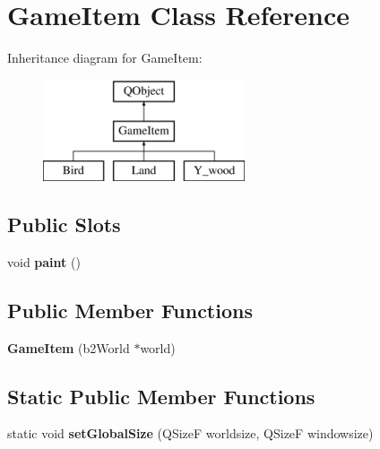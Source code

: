 \hypertarget{classGameItem}{\section{Game\-Item Class Reference}
\label{classGameItem}
}
Inheritance diagram for Game\-Item\-:\begin{figure}[H]
\begin{center}
\leavevmode
\includegraphics[height=3.000000cm]{classGameItem}
\end{center}
\end{figure}
\subsection*{Public Slots}
\begin{DoxyCompactItemize}
\item 
\hypertarget{classGameItem_a579065cc7a90d31ad5d17b8b6feddabb}{void {\bfseries paint} ()}\label{classGameItem_a579065cc7a90d31ad5d17b8b6feddabb}

\end{DoxyCompactItemize}
\subsection*{Public Member Functions}
\begin{DoxyCompactItemize}
\item 
\hypertarget{classGameItem_a6d2b35fc97b11e0c9fd0105320cea69f}{{\bfseries Game\-Item} (b2\-World $\ast$world)}\label{classGameItem_a6d2b35fc97b11e0c9fd0105320cea69f}

\end{DoxyCompactItemize}
\subsection*{Static Public Member Functions}
\begin{DoxyCompactItemize}
\item 
\hypertarget{classGameItem_aa82bd0ad63ecb3ca6587707c3998d2e8}{static void {\bfseries set\-Global\-Size} (Q\-Size\-F worldsize, Q\-Size\-F windowsize)}\label{classGameItem_aa82bd0ad63ecb3ca6587707c3998d2e8}

\end{DoxyCompactItemize}

